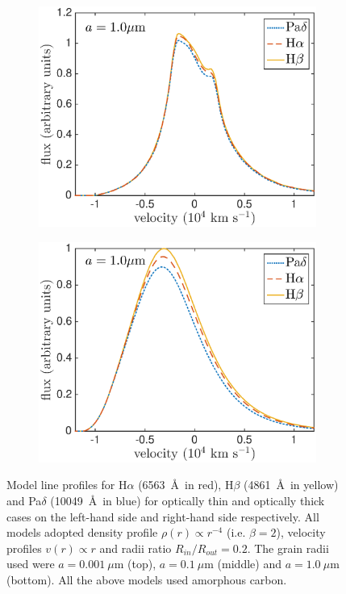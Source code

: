 \begin{figure}
\begin{subfigure}{0.5\textwidth}
\includegraphics[trim =10 0 25 15,clip=true,scale=0.42]{chapters/chapter4/images/dustdep/a1_opt_thin_HaHbPad}
\end{subfigure}
\hspace{3mm}
\begin{subfigure}{0.5\textwidth}
\includegraphics[trim =38 0 45 15,clip=true,scale=0.42]{chapters/chapter4/images/dustdep/a1_opt_thick_HaHbPad}
\end{subfigure}
\caption{Model line profiles for H$\alpha$ (6563~\AA\ in red), H$\beta$ (4861~\AA\ in yellow) and Pa$\delta$ (10049~\AA\ in blue) for optically thin and  optically thick cases on the left-hand side and right-hand side respectively.  All models adopted density profile $\rho(r) \propto r^{-4}$ (i.e. $\beta = 2$), velocity profiles $v(r) \propto r$ and radii ratio $R_{in}/R_{out}=0.2$.  The grain radii used were $a=0.001~\mu$m (top), $a=0.1~\mu$m (middle) and $a=1.0~\mu$m (bottom). All the above models used amorphous carbon.}
\label{wav_dep}
\end{figure}

